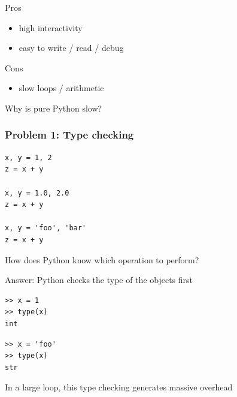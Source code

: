 \documentclass[
    xcolor={svgnames,dvipsnames},
    hyperref={colorlinks, citecolor=DeepPink4, linkcolor=DarkRed, urlcolor=DarkBlue}
    ]{beamer}  %
\newcommand{\1}{\mathbbm 1}
\begin{document}
\begin{frame}

    Pros

    \begin{itemize}
        \item high interactivity
        \item easy to write / read / debug
    \end{itemize}

    \vspace{0.5em}

    Cons

    \begin{itemize}
        \item slow loops / arithmetic
    \end{itemize}



\end{frame}


\begin{frame}
    
    \vspace{0.5em}
    Why is pure Python slow?

    \vspace{0.5em}

\end{frame}

\begin{frame}[fragile]
    \frametitle{Problem 1: Type checking}

    \begin{verbatim}
x, y = 1, 2
z = x + y       

x, y = 1.0, 2.0
z = x + y      

x, y = 'foo', 'bar'
z = x + y     
    \end{verbatim}

    \vspace{0.5em}
    \vspace{0.5em}

How does Python know which operation to perform?

\end{frame}


\begin{frame}[fragile]

    Answer: Python checks the type of the objects first

    \begin{verbatim}
>> x = 1
>> type(x)
int
    \end{verbatim}

    \begin{verbatim}
>> x = 'foo'
>> type(x)
str
    \end{verbatim}


    In a large loop, this type checking generates massive overhead
\end{frame}
\end{document}

